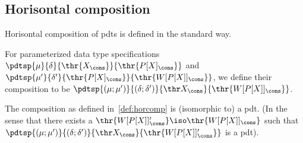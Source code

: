 \subsection{Horisontal composition}\label{sec:semfunccomp}
Horisontal composition of pdts is defined in the standard way.
\begin{definition}\label{def:horcomp}
For parameterized data type specifications
$\pdtsp{\mu}{\delta}{\thr{X_\cons}}{\thr{P[X]_\cons}}$ and
$\pdtsp{\mu'}{\delta'}{\thr{P[X]_\cons}}{\thr{W[P[X]]_\cons}}$,
we define their composition to be $\pdtsp{(\mu;\mu')}{(\delta;\delta')}{\thr
X_\cons}{\thr{W[P[X]]_\cons}}$. 
\end{definition}
%
\begin{proposition}\label{prop:horcomp}
The composition as defined in~\ref{def:horcomp} is (isomorphic to) a pdt. (In
the sense that there exists a $\thr{W[P[X]]'_\cons}\iso\thr{W[P[X]]_\cons}$
such that $\pdtsp{(\mu;\mu')}{(\delta;\delta')}{\thr
X_\cons}{\thr{W[P[X]]'_\cons}}$ is a pdt).
\end{proposition}
